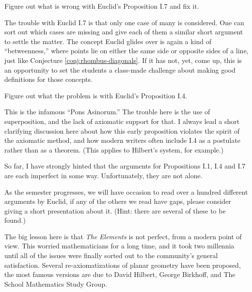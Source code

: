 \begin{problem}\label{prob:fix-I.7}
Figure out what is wrong with Euclid's Proposition I.7 and fix it.
\end{problem}

\begin{annotation}
{
\color{blue}
The trouble with Euclid I.7 is that only one case of many is considered. One can sort out which cases are missing and give each of them a similar short argument to settle the matter. The concept Euclid glides over is again a kind of ``betweenness,'' where points lie on either the same side or opposite sides of a line, just like Conjecture \ref{conj:rhombus-diagonals}. If it has not, yet, come up, this is an opportunity to set the students a class-made challenge about making good definitions for those concepts. 
}
\end{annotation}

\begin{problem}\label{prob:fix-I.4}
Figure out what the problem is with Euclid's Proposition I.4.
\end{problem}

\begin{annotation}
{
\color{blue}
This is the infamous ``Pons Asinorum.'' The trouble here is the use of superposition, and the lack of axiomatic support for that. I always lead a short clarifying discussion here about how this early proposition violates the spirit of the axiomatic method, and how modern writers often include I.4 as a postulate rather than as a theorem. (This applies to Hilbert's system, for example.)
}
\end{annotation}

So far, I have strongly hinted that the arguments for Propositions I.1, I.4 and I.7 are each imperfect in some way.
Unfortunately, they are not alone.

\begin{problem}
As the semester progresses, we will have occasion to read over a hundred different arguments by Euclid, if any of the others we read have gaps, please consider giving a short presentation about it.
(Hint: there are several of these to be found.)
\end{problem}

The big lesson here is that \emph{The Elements} is not perfect, from a modern point of view.
This worried mathematicians for a long time, and it took two millennia until all of the issues were finally sorted out to the community's general satisfaction.
Several re-axiomatizations of planar geometry have been proposed, the most famous versions are due to David Hilbert, George Birkhoff, and The School Mathematics Study Group.



